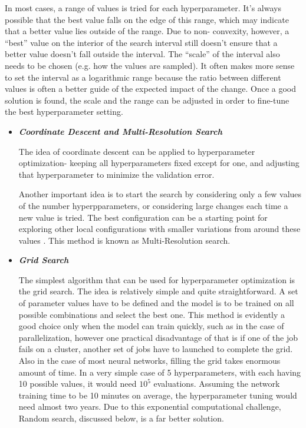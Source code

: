 \documentclass[twoside]{article}
\begin{document}
In most cases, a range of values is tried for each hyperparameter. It’s always possible that the best value falls on the edge of this range, which may indicate that a better value lies outside of the range. Due to non- convexity, however, a “best” value on the interior of the search interval still doesn’t ensure that a better value doesn’t fall outside the interval. The “scale” of the interval also needs to be chosen (e.g. how the values are sampled). It often makes more sense to set the interval as a logarithmic range because the ratio between different values is often a better guide of the expected impact of the change. Once a good solution is found, the scale and the range can be adjusted in order to fine-tune the best hyperparameter setting.
\begin{itemize}
\item \textit{\textbf{Coordinate Descent and Multi-Resolution Search}}

The idea of coordinate descent can be applied to hyperparameter optimization- keeping all hyperparameters fixed except for one, and adjusting that hyperparameter to minimize the validation error.

Another important idea is to start the search by considering only a few values of the number hyperpparameters, or considering large changes each time a new value is tried. The best configuration can be a starting point for exploring other local configurations with smaller variations from around these values \cite{bengio2012practical}. This method is known as Multi-Resolution search.
\item \textit{\textbf{Grid Search}}

The simplest algorithm that can be used for hyperparameter optimization is the grid search. The idea is relatively simple and quite straightforward. A set of parameter values have to be defined and the model is to be trained on all possible combinations and select the best one. This method is evidently a good choice only when the model can train quickly, such as in the case of parallelization, however one practical disadvantage of that is if one of the job fails on a cluster, another set of jobs have to launched to complete the grid. Also in the case of most neural networks, filling the grid takes enormous amount of time. In a very simple case of 5 hyperparameters, with each having 10 possible values, it would need $10^5$ evaluations. Assuming the network training time to be 10 minutes on average, the hyperparameter tuning would need almost two years. Due to this exponential computational challenge, Random search, discussed below, is a far better solution.


\end{itemize}
\end{document}
